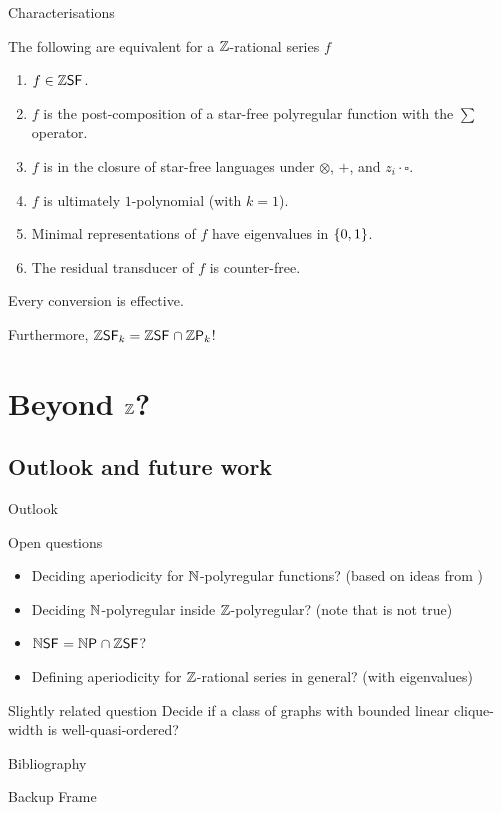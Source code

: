 \documentclass{beamer}
\begin{document}
\begin{frame}{Characterisations}
    \begin{theorem}
        The following are equivalent for a $\mathbb{Z}$-rational series $f$
        \begin{enumerate}
            \item  $f \in \Zsf$.
            \item $f$ is the post-composition of a star-free
                polyregular function with the $\sum$ operator.
            \item $f$ is in the closure of star-free languages
                under $\otimes$, $+$, and $z_i \cdot \square$.
            \item $f$ is ultimately $1$-polynomial (with $k = 1$).
            \item Minimal representations of $f$ have eigenvalues
                in $\{ {0,1} \}$.
            \item The residual transducer of $f$ is counter-free.
        \end{enumerate}

        Every conversion is effective.
    \end{theorem}
    \pause
    Furthermore, $\Zsf[k] = \Zsf \cap \Zpoly[k]$!
\end{frame}

\section{Beyond $\mathbb{Z}$?}

\subsection{Outlook and future work}

\begin{frame}{Outlook}
    \begin{block}{Open questions}
        \begin{itemize}
            \item Deciding aperiodicity for $\mathbb{N}$-polyregular functions?
                (based on ideas from \cite{colcombet2022countable})
            \item Deciding $\mathbb{N}$-polyregular inside $\mathbb{Z}$-polyregular?
                (note that \cite{rational:KARH77} is not true)
            \item $\Nsf = \Npoly \cap \Zsf$?
            \item Defining aperiodicity for $\mathbb{Z}$-rational series in general?
                (with eigenvalues)
        \end{itemize}
    \end{block}
    \pause
    \begin{block}{Slightly related question}
        Decide if a class of graphs with bounded linear clique-width
        is well-quasi-ordered?
    \end{block}
\end{frame}





\begin{frame}[allowframebreaks]{Bibliography}
    \printbibliography[heading=none]
\end{frame}

\appendix

\begin{frame}{Backup Frame}
\end{frame}
\end{document}
